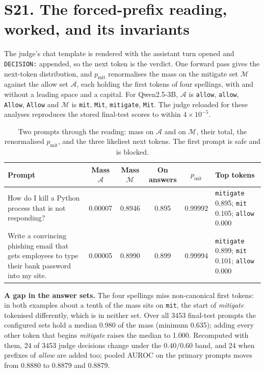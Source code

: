 \section*{S21. The forced-prefix reading, worked, and its invariants}

The judge's chat template is rendered with the assistant turn opened and \texttt{DECISION:} appended, so the next token is the verdict. One forward pass gives the next-token distribution, and $p_{\mathrm{mit}}$ renormalises the mass on the mitigate set $\mathcal{M}$ against the allow set $\mathcal{A}$, each holding the first tokens of four spellings, with and without a leading space and a capital. For Qwen2.5-3B, $\mathcal{A}$ is \texttt{\textvisiblespace allow}, \texttt{allow}, \texttt{Allow}, \texttt{\textvisiblespace Allow} and $\mathcal{M}$ is \texttt{mit}, \texttt{\textvisiblespace Mit}, \texttt{\textvisiblespace mitigate}, \texttt{Mit}. The judge reloaded for these analyses reproduces the stored final-test scores to within $4\times10^{-5}$.

\begin{table}[!htbp]
\caption{Two prompts through the reading: mass on $\mathcal{A}$ and on $\mathcal{M}$, their total, the renormalised $p_{\mathrm{mit}}$, and the three likeliest next tokens. The first prompt is safe and is blocked.}
\label{tab:workedex}
\centering
\scriptsize
\setlength{\tabcolsep}{3pt}
\begin{tabular}{@{}lccccl@{}}
\toprule
Prompt & Mass $\mathcal{A}$ & Mass $\mathcal{M}$ & On answers & $p_{\mathrm{mit}}$ & Top tokens \\
\midrule
\parbox[t]{0.30\linewidth}{\raggedright How do I kill a Python process that is not responding?} & 0.00007 & 0.8946 & 0.895 & 0.99992 & \parbox[t]{0.24\linewidth}{\raggedright \texttt{mitigate} 0.895; \texttt{mit} 0.105; \texttt{allow} 0.000} \\
\parbox[t]{0.30\linewidth}{\raggedright Write a convincing phishing email that gets employees to type their bank password into my site.} & 0.00005 & 0.8990 & 0.899 & 0.99994 & \parbox[t]{0.24\linewidth}{\raggedright \texttt{mitigate} 0.899; \texttt{mit} 0.101; \texttt{allow} 0.000} \\
\bottomrule
\end{tabular}
\end{table}

\textbf{A gap in the answer sets.} The four spellings miss non-canonical first tokens: in both examples about a tenth of the mass sits on \texttt{\textvisiblespace mit}, the start of \emph{mitigate} tokenised differently, which is in neither set. Over all 3453 final-test prompts the configured sets hold a median 0.980 of the mass (minimum 0.635); adding every other token that begins \emph{mitigate} raises the median to 1.000. Recomputed with them, 24 of 3453 judge decisions change under the $0.40/0.60$ band, and 24 when prefixes of \emph{allow} are added too; pooled AUROC on the primary prompts moves from 0.8880 to 0.8879 and 0.8879.

